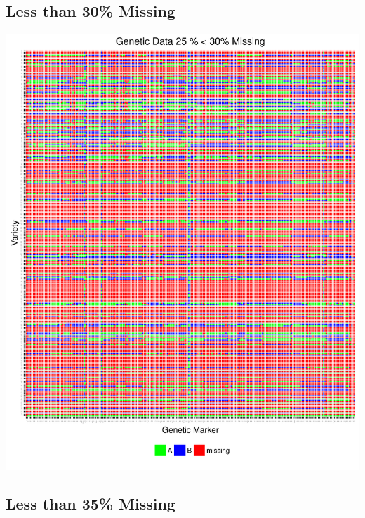 \documentclass[11pt]{article}\usepackage[]{graphicx}\usepackage[]{color}
\makeatletter
\def\maxwidth{ %
  \ifdim\Gin@nat@width>\linewidth
    \linewidth
  \else
    \Gin@nat@width
  \fi
}
\newenvironment{knitrout}{}{} %
\makeatother
\begin{document}
\subsection{Less than 30\% Missing}

\begin{knitrout}\footnotesize
{}\color{fgcolor}

{\centering \includegraphics[width=\maxwidth]{figure/missing_plot30-1} 

}



\end{knitrout}

\subsection{Less than 35\% Missing}
\end{document}
